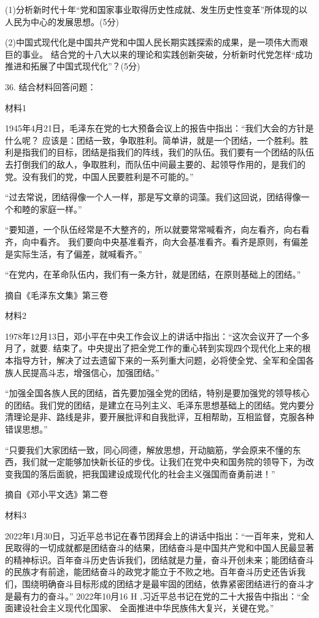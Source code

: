 \documentclass[UTF8,11pt]{ctexart}
\begin{document}
(1)分析新时代十年“党和国家事业取得历史性成就、发生历史性变革”所体现的以人民为中心的发展思想。(5分)

(2)中国式现代化是中国共产党和中国人民长期实践探索的成果，是一项伟大而艰巨的事业。 结合党的十八大以来的理论和实践创新突破，分析新时代党怎样“成功推进和拓展了中国式现代化”？(5分)

36. 结合材料回答问题：

材料1

1945年4月21日，毛泽东在党的七大预备会议上的报告中指出：“我们大会的方针是什么呢？ 应该是：团结一致，争取胜利。简单讲，就是一个团结，一个胜利。胜利是指我们的目标，团结是指我们的阵线，我们的队伍。我们要有一个团结的队伍去打倒我们的敌人，争取胜利，而队伍中间最主要的、起领导作用的，是我们的党。没有我们的党，中国人民要胜利是不可能的。”

“过去常说，团结得像一个人一样，那是写文章的词藻。我们这回说，团结得像一个和睦的家庭一样。”

“要知道，一个队伍经常是不大整齐的，所以就要常常喊看齐，向左看齐，向右看齐，向中看齐。 我们要向中央基准看齐，向大会基准看齐。看齐是原则，有偏差是实际生活，有了偏差，就喊看齐。”

“在党内，在革命队伍内，我们有一条方针，就是团结，在原则基础上的团结。”

摘自《毛泽东文集》第三卷

材料2

1978年12月13日，邓小平在中央工作会议上的讲话中指出：“这次会议开了一个多月了，就要. 结束了。中央提出了把全党工作的重心转到实现四个现代化上来的根本指导方针，解决了过去遗留下来的一系列重大问题，必将使全党、全军和全国各族人民提高斗志，增强信心，加强团结。”

“加强全国各族人民的团结，首先要加强全党的团结，特别是要加强党的领导核心的团结。我们党的团结，是建立在马列主义、毛泽东思想基础上的团结。党内要分清理论是非、路线是非，要开展批评和自我批评，互相帮助，互相监督，克服各种错误思想。”

“只要我们大家团结一致，同心同德，解放思想，开动脑筋，学会原来不懂的东西，我们就一定能够加快新长征的步伐。让我们在党中央和国务院的领导下，为改变我国的落后面貌，把我国建设成现代化的社会主义强国而奋勇前进！”

摘自《邓小平文选》第二卷

材料3

2022年1月30日，习近平总书记在春节团拜会上的讲话中指出：“一百年来，党和人民取得的一切成就都是团结奋斗的结果，团结奋斗是中国共产党和中国人民最显著的精神标识。百年奋斗历史告诉我们，团结就是力量，奋斗开创未来；能团结奋斗的民族才有前途，能团结奋斗的政党才能立于不败之地。百年奋斗历史还告诉我们，围绕明确奋斗目标形成的团结才是最牢固的团结，依靠紧密团结进行的奋斗才是最有力的奋斗。” 2022年10月16 H ,习近平总书记在党的二十大报告中指出：“全面建设社会主义现代化国家、 全面推进中华民族伟大复兴，关键在党。”
\end{document}
